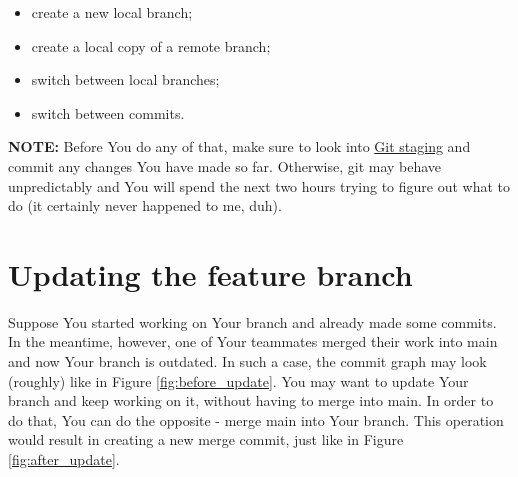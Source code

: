 \documentclass{article}
\begin{document}
\begin{itemize}
    \item create a new local branch;
    \item create a local copy of a remote branch;
    \item switch between local branches;
    \item switch between commits.
\end{itemize}

\textbf{NOTE: } Before You do any of that, make sure to look into \hyperref[sec:git_staging]{Git staging} and commit any changes You have made so far. Otherwise, git may behave unpredictably and You will spend the next two hours trying to figure out what to do (it certainly never happened to me, duh). 

\section{Updating the feature branch}

Suppose You started working on Your branch and already made some commits. In the meantime, however, one of Your teammates merged their work into main and now Your branch is outdated. In such a case, the commit graph may look (roughly) like in Figure \ref{fig:before_update}. You may want to update Your branch and keep working on it, without having to merge into main. In order to do that, You can do the opposite - merge main into Your branch. This operation would result in creating a new merge commit, just like in Figure \ref{fig:after_update}.\newline
\end{document}
